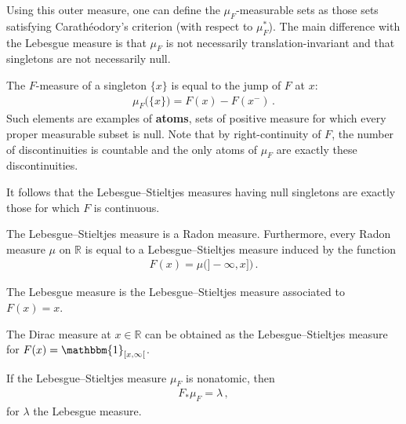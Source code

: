     Using this outer measure, one can define the $\mu_F$-measurable sets as those sets satisfying Carath\'eodory's criterion (with respect to $\mu_F^*$). The main difference with the Lebesgue measure is that $\mu_F$ is not necessarily translation-invariant and that singletons are not necessarily null.
    \begin{property}[Singletons]
        The $F$-measure of a singleton $\{x\}$ is equal to the jump of $F$ at $x$:
        \begin{gather}
            \mu_F\bigl(\{x\}\bigr) = F(x) - F(x^-)\,.
        \end{gather}
        Such elements are examples of \textbf{atoms}, sets of positive measure for which every proper measurable subset is null. Note that by right-continuity of $F$, the number of discontinuities is countable and the only atoms of $\mu_F$ are exactly these discontinuities.
    \end{property}
    \begin{result}
        It follows that the Lebesgue--Stieltjes measures having null singletons are exactly those for which $F$ is continuous.
    \end{result}

    \begin{property}[Regularity]
        The Lebesgue--Stieltjes measure is a Radon measure. Furthermore, every Radon measure $\mu$ on $\mathbb{R}$ is equal to a Lebesgue--Stieltjes measure induced by the function
        \begin{gather}
            F(x) = \mu\bigl(]-\!\infty,x]\bigr)\,.
        \end{gather}
    \end{property}

    \begin{example}
        The Lebesgue measure is the Lebesgue--Stieltjes measure associated to $F(x)=x$.
    \end{example}
    \begin{example}
        The Dirac measure at $x\in\mathbb{R}$ can be obtained as the Lebesgue--Stieltjes measure for $F(x)=\mathbbm{1}_{[x,\infty[}$.
    \end{example}

    \begin{property}
        If the Lebesgue--Stieltjes measure $\mu_F$ is nonatomic, then
        \begin{gather}
            F_\ast\mu_F = \lambda\,,
        \end{gather}
        for $\lambda$ the Lebesgue measure.
    \end{property}

